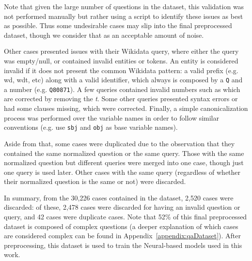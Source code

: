Note that given the large number of questions in the dataset, this validation was not performed 
manually but rather using a script to identify these issues as best as possible. Thus some 
undesirable cases may slip into the final preprocessed dataset, though we consider that as an 
acceptable amount of noise.

Other cases presented issues with their Wikidata \SPARQL{} query, where either the query was 
empty/null, or contained invalid entities or tokens. An entity is considered invalid if it does 
not present the common Wikidata pattern: a valid prefix (e.g. wd, wdt, etc) along with a valid 
identifier, which always is composed by a \texttt{Q} and a number (e.g. \texttt{Q80871}). A few 
queries contained invalid numbers such as  which are corrected by removing the 
\textit{t}. Some other queries presented syntax errors or had some clauses missing, which were 
corrected. Finally, a simple canonicalization process was performed over the variable names in 
order to follow similar conventions (e.g. use \texttt{sbj} and \texttt{obj} as base variable 
names).

Aside from that, some cases were duplicated due to the observation that they contained the same 
normalized question or the same \SPARQL{} query. Those with the same normalized question but 
different \SPARQL{} queries were merged into one case, though just one \SPARQL{} query is used later. 
Other cases with the same \SPARQL{} query (regardless of whether their normalized question is the 
same or not) were discarded.

In summary, from the 30,226 cases contained in the \LCQuADtwo{} dataset, 2,520 cases were 
discarded: of these, 2,478 cases were discarded for having an invalid question or query, and 42 
cases were duplicate cases. Note that 52\% of this final preprocessed dataset is composed of 
complex questions (a deeper explanation of which cases are considered complex can be found in 
Appendix~\ref{appendix:qaDataset}). After preprocessing, this dataset is used to train the 
Neural-based models used in this work.

